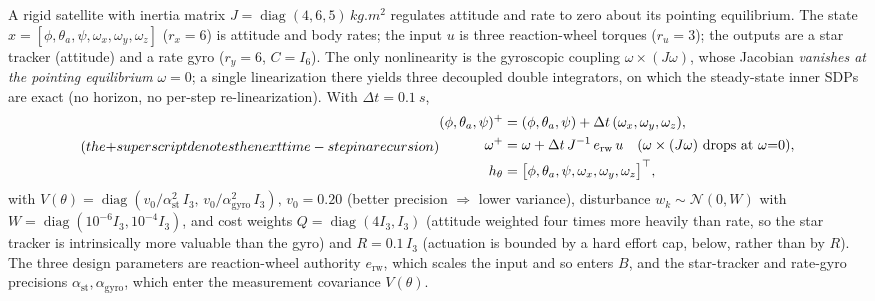 \documentclass[twocolumn,amsthm]{autart}
\begin{document}
A rigid satellite with inertia matrix
$J=\operatorname{diag}(4,6,5)\,\si{kg.m^2}$ regulates attitude and rate to zero
about its pointing equilibrium.
The state $x=[\phi,\theta_a,\psi,\omega_x,\omega_y,\omega_z]$ ($r_x=6$) is attitude and body rates; the input $u$ is three reaction-wheel
torques ($r_u=3$); the outputs are a star tracker (attitude) and a rate gyro
($r_y=6$, $C=I_6$). The only nonlinearity is the gyroscopic coupling $\omega\times
(J\omega)$, whose Jacobian \emph{vanishes at the pointing equilibrium} $\omega=0$;
a single linearization there yields three decoupled double integrators, on which
the steady-state inner SDPs are exact (no horizon, no per-step re-linearization).
With $\Delta t=\SI{0.1}{s}$,
\begin{subequations}\label{eq:adcs-model} (the $+$ superscript denotes the next time-step in a recursion)
\begin{align}
(\phi,\theta_a,\psi)^{+} &= (\phi,\theta_a,\psi) + \Delta t\,(\omega_x,\omega_y,\omega_z),\\
\omega^{+} &= \omega + \Delta t\,J^{-1}\,e_{\mathrm{rw}}\,u \quad(\omega\times(J\omega)\ \text{drops at}\ \omega{=}0),\\
h_\theta &= \big[\phi,\theta_a,\psi, \omega_x,\omega_y,\omega_z\big]^\top,
\end{align}
\end{subequations}
with $V(\theta)=\operatorname{diag}(v_0/\alpha_{\mathrm{st}}^2\,I_3,\,v_0/\alpha_{\mathrm{gyro}}^2\,I_3), \, v_0=0.20$
(better precision $\Rightarrow$ lower variance), disturbance $w_k\sim\mathcal N(0,W)$ with
$W=\operatorname{diag}(10^{-6}I_3,10^{-4}I_3)$, and cost weights
$Q=\operatorname{diag}(4I_3,I_3)$ (attitude weighted four times more heavily than
rate, so the star tracker is intrinsically more valuable than the gyro) and
$R=0.1\,I_3$ (actuation is bounded by a hard effort cap, below, rather than by $R$).
The three design parameters are reaction-wheel authority $e_{\mathrm{rw}}$, which
scales the input and so enters $B$, and the star-tracker and rate-gyro precisions
$\alpha_{\mathrm{st}},\alpha_{\mathrm{gyro}}$, which enter the measurement
covariance $V(\theta)$.
\end{document}
